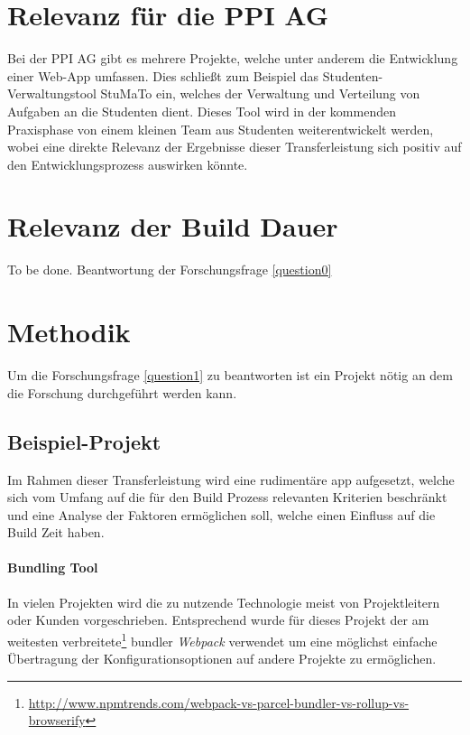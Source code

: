 \documentclass[11pt]{report}
\begin{document}
	    \pagebreak

		\section{Relevanz für die PPI AG}
			Bei der PPI AG gibt es mehrere Projekte, welche unter anderem die Entwicklung einer Web-App umfassen. Dies schließt zum Beispiel das Studenten-Verwaltungstool StuMaTo ein, welches der Verwaltung und Verteilung von Aufgaben an die Studenten dient. Dieses Tool wird in der kommenden Praxisphase von einem kleinen Team aus Studenten weiterentwickelt werden, wobei eine direkte Relevanz der Ergebnisse dieser Transferleistung sich positiv auf den Entwicklungsprozess auswirken könnte.
	
		\section{Relevanz der Build Dauer}
		 	To be done. Beantwortung der Forschungsfrage \ref{question0} %

		\section{Methodik}
			Um die Forschungsfrage \ref{question1} zu beantworten ist ein Projekt nötig an dem die Forschung durchgeführt werden kann.
			\subsection{Beispiel-Projekt}
				Im Rahmen dieser Transferleistung wird eine rudimentäre \Gls{app} aufgesetzt, welche sich vom Umfang auf die für den Build Prozess relevanten Kriterien beschränkt und eine Analyse der Faktoren ermöglichen soll, welche einen Einfluss auf die Build Zeit haben.

				\paragraph{Bundling Tool} In vielen Projekten wird die zu nutzende Technologie meist von Projektleitern oder Kunden vorgeschrieben. Entsprechend wurde für dieses Projekt der am weitesten verbreitete\footnote{\url{http://www.npmtrends.com/webpack-vs-parcel-bundler-vs-rollup-vs-browserify}} \Gls{bundler} \emph{Webpack} verwendet um eine möglichst einfache Übertragung der Konfigurationsoptionen auf andere Projekte zu ermöglichen.
\end{document}
